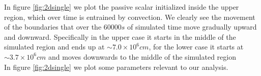 \begin{figure}[t!]
  \centering
  \centering
  \hfill
  \end{figure}
In figure \ref{fig:2dsingle} we plot the passive scalar initialized inside the upper region, which over time is entrained by convection. We clearly see the movement of the boundaries that over the $60000 s$ of simulated time move gradually upward and downward. Specifically in the upper case it starts in the middle of the simulated region and ends up at $\sim 7.0 \times 10^{6} cm$, for the lower case it starts at $\sim 3.7 \times 10^{6} cm$ and moves downwards to the middle of the simulated region \\
In figure \ref{fig:2dsingle} we plot some parameters relevant to our analysis. \\
